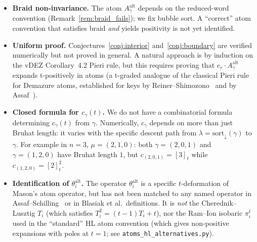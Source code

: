 \documentclass[11pt]{article}
\theoremstyle{definition}
\newcommand{\gauss}[1]{[#1]_t}
\newcommand{\Aalt}{A^{\mathrm{alt}}}
\newcommand{\theal}{\theta^{\mathrm{alt}}}
\begin{document}
\begin{itemize}
\item \textbf{Braid non-invariance.} The atom $\Aalt_\gamma$ depends on the reduced-word
   convention (Remark~\ref{rem:braid_fails}); we fix bubble sort. A ``correct'' atom
   convention that satisfies braid \emph{and} yields positivity is not yet identified.

\item \textbf{Uniform proof.} Conjectures~\ref{conj:interior} and~\ref{conj:boundary} are
   verified numerically but not proved in general. A natural approach is by induction on
   the vDEZ Corollary~4.2 Pieri rule, but this requires proving that $e_r\cdot \Aalt_\gamma$
   expands t-positively in atoms (a t-graded analogue of the classical Pieri rule for
   Demazure atoms, established for keys by
   Reiner--Shimozono~\cite{ReinerShimozono} and by Assaf~\cite{AssafKeys}).

\item \textbf{Closed formula for $c_\gamma(t)$.} We do not have a combinatorial formula
   determining $c_\gamma(t)$ from $\gamma$. Numerically, $c_\gamma$ depends on more than
   just Bruhat length: it varies with the specific descent path from
   $\lambda=\mathrm{sort}_{\downarrow}(\gamma)$ to $\gamma$. For example in $n=3$,
   $\mu=(2,1,0)$: both $\gamma=(2,0,1)$ and $\gamma=(1,2,0)$ have Bruhat length $1$, but
   $c_{(2,0,1)}=\gauss{3}$ while $c_{(1,2,0)}=\gauss{2}^2$.

\item \textbf{Identification of $\theal_i$.} The operator $\theal_i$ is a specific
   $t$-deformation of Mason's atom operator, but has not been matched to any named
   operator in Assaf--Schilling~\cite{AS17} or in Blasiak et al.\ definitions. It is
   \emph{not} the Cherednik--Lusztig $T_i$ (which satisfies $T_i^2=(t-1)T_i+t$), nor
   the Ram--Ion isobaric $\pi_i^t$ used in the ``standard'' HL atom convention (which
   gives non-positive expansions with poles at $t=1$; see
   \texttt{atoms\_hl\_alternatives.py}).
\end{itemize}
\end{document}
